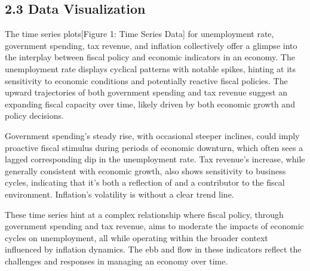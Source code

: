 \documentclass[
  letterpaper,
  DIV=11,
  numbers=noendperiod]{scrartcl}
\begin{document}
\hypertarget{data-visualization}{%
\subsection{2.3 Data Visualization}\label{data-visualization}}

The time series plots{[}Figure 1: Time Series Data{]} for unemployment
rate, government spending, tax revenue, and inflation collectively offer
a glimpse into the interplay between fiscal policy and economic
indicators in an economy. The unemployment rate displays cyclical
patterns with notable spikes, hinting at its sensitivity to economic
conditions and potentially reactive fiscal policies. The upward
trajectories of both government spending and tax revenue suggest an
expanding fiscal capacity over time, likely driven by both economic
growth and policy decisions.

Government spending's steady rise, with occasional steeper inclines,
could imply proactive fiscal stimulus during periods of economic
downturn, which often sees a lagged corresponding dip in the
unemployment rate. Tax revenue's increase, while generally consistent
with economic growth, also shows sensitivity to business cycles,
indicating that it's both a reflection of and a contributor to the
fiscal environment. Inflation's volatility is without a clear trend
line.

These time series hint at a complex relationship where fiscal policy,
through government spending and tax revenue, aims to moderate the
impacts of economic cycles on unemployment, all while operating within
the broader context influenced by inflation dynamics. The ebb and flow
in these indicators reflect the challenges and responses in managing an
economy over time.
\end{document}
